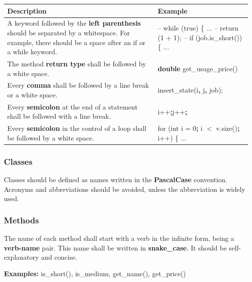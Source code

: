 \documentclass{scrreprt}
\begin{document}
\begin{center}
    \begin{tabular}{|p{8cm}|p{6cm}|}
        \hline
	    Description & Example\\
        \hline
	    A keyword followed by the \textbf{left parenthesis} should be separated by a whitespace. \newline For example, there should be a space after an if or a while keyword. &  – while (true) \{ ... \newline – return (1 + 1); \newline – if (job.is_short()) \{ ... \\
	    \hline
	    The method \textbf{return type} shall be followed by a white space. & \textbf{double} get_usage_price() \\
	    \hline
	  	Every \textbf{comma} shall be followed by a line break or a white space. & insert_state(i\textbf{, }j\textbf{, }job); \\
	  	\hline
	  	Every \textbf{semicolon} at the end of a statement shall be followed with a line break. & i++\textbf{;}\newline j++\textbf{;}\\
	    \hline
	    Every \textbf{semicolon} in the control of a loop shall be followed by a white space. & for (int i = 0\textbf{; } i $<$ v.size()\textbf{; }i++) \{ ...\\
	    \hline
    \end{tabular}
\end{center}

\subsubsection{Classes}

\par Classes should be defined as names written in the \textbf{PascalCase} convention. Acronyms and abbreviations should be avoided, unless the abbreviation is widely used.

\subsubsection{Methods}

\par The name of each method shall start with a verb in the infinite form, being a \textbf{verb-name} pair. This name shall be written in \textbf{snake_case}. It should be self-explanatory and concise.

\par \textbf{Examples:} is_short(), is_medium, get_name(), get_price()
\end{document}
